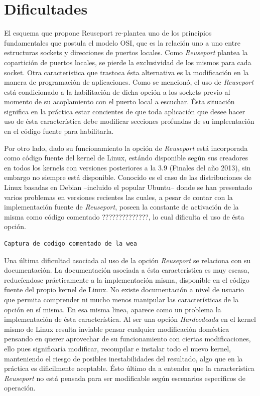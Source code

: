 \section{Dificultades}

El esquema que propone Reuseport re-plantea uno de los principios fundamentales que postula el modelo OSI, que es la relación uno a uno entre estructuras sockets y direcciones de puertos locales. Como \emph{Reuseport} plantea la copartición de puertos locales, se pierde la exclusividad de los mismos para cada socket. Otra caracteristica que trastoca ésta alternativa es la modificación en la manera de programación de aplicaciones. Como se mencionó, el uso de \emph{Reuseport} está condicionado a la habilitación de dicha opción a los sockets previo al momento de su acoplamiento con el puerto local a escuchar. Ésta situación significa en la práctica estar concientes de que toda aplicación que desee hacer uso de ésta característica debe modificar secciones profundas de su impleentación en el código fuente para habilitarla.

Por otro lado, dado su funcionamiento la opción de \emph{Reuseport} está incorporada como código fuente del kernel de Linux, estándo disponible según sus creadores en todos los kernels con versiones posteriores a la 3.9 (Finales del año 2013), sin embargo no siempre está disponible. Conocido es el caso de las distribuciones de Linux basadas en Debian --incluido el popular Ubuntu-- donde se han presentado varios problemas en versiones recientes las cuales, a pesar de contar con la implementación fuente de \emph{Reuseport}, poseen la constante de activación de la misma como código comentado ??????????????, lo cual dificulta el uso de ésta opción.

\begin{lstlisting}[caption=ESO]
Captura de codigo comentado de la wea
\end{lstlisting}

Una última dificultad asociada al uso de la opción \emph{Reuseport} se relaciona con su documentación. La documentación asociada a ésta característica es muy escasa, reducíendose prácticamente a la implementación misma, disponible en el código fuente del propio kernel de Linux. No existe documentación a nivel de usuario que permita comprender ni mucho menos manipular las características de la opción en sí misma. En esa misma linea, aparece como un problema la implementación de ésta característica. Al ser una opción \emph{Hardcodeada} en el kernel mismo de Linux resulta inviable pensar cualquier modificación doméstica pensando en querer aprovechar de su funcionamiento con ciertas modificaciones, ello pues significaría modificar, recompilar e instalar todo el nuevo kernel, manteniendo el riesgo de posibles inestabilidades del resultado, algo que en la práctica es dificilmente aceptable. Ésto último da a entender que la característica \emph{Reuseport} no está pensada para ser modificable según escenarios especificos de operación.
